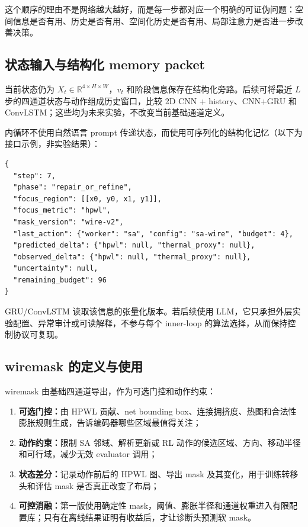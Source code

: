 \documentclass[UTF8,a4paper,11pt]{ctexart}
\begin{document}
这个顺序的理由不是网络越大越好，而是每一步都对应一个明确的可证伪问题：空间信息是否有用、历史是否有用、空间化历史是否有用、局部注意力是否进一步改善决策。

\subsection{状态输入与结构化 memory packet}

当前状态仍为 $X_t\in\mathbb{R}^{4\times H\times W}$，$v_t$ 和阶段信息保存在结构化旁路。后续可将最近 $L$ 步的四通道状态与动作组成历史窗口，比较 2D CNN + history、CNN+GRU 和 ConvLSTM；这些均为未来实验，不改变当前基础通道定义。

内循环不使用自然语言 prompt 传递状态，而使用可序列化的结构化记忆（以下为接口示例，非实验结果）：

\begin{verbatim}
{
  "step": 7,
  "phase": "repair_or_refine",
  "focus_region": [[x0, y0, x1, y1]],
  "focus_metric": "hpwl",
  "mask_version": "wire-v2",
  "last_action": {"worker": "sa", "config": "sa-wire", "budget": 4},
  "predicted_delta": {"hpwl": null, "thermal_proxy": null},
  "observed_delta": {"hpwl": null, "thermal_proxy": null},
  "uncertainty": null,
  "remaining_budget": 96
}
\end{verbatim}

GRU/ConvLSTM 读取该信息的张量化版本。若后续使用 LLM，它只承担外层实验配置、异常审计或可读解释，不参与每个 inner-loop 的算法选择，从而保持控制协议可复现。

\subsection{wiremask 的定义与使用}

wiremask 由基础四通道导出，作为可选门控和动作约束：

\begin{enumerate}
    \item \textbf{可选门控：}由 HPWL 贡献、net bounding box、连接拥挤度、热图和合法性膨胀规则生成，告诉编码器哪些区域最值得关注；
    \item \textbf{动作约束：}限制 SA 邻域、解析更新或 RL 动作的候选区域、方向、移动半径和可行域，减少无效 evaluator 调用；
    \item \textbf{状态差分：}记录动作前后的 HPWL 图、导出 mask 及其变化，用于训练转移头和评估 mask 是否真正改变了布局；
    \item \textbf{可控消融：}第一版使用确定性 mask，阈值、膨胀半径和通道权重进入有限配置库；只有在离线结果证明有收益后，才让诊断头预测软 mask。
\end{enumerate}
\end{document}
